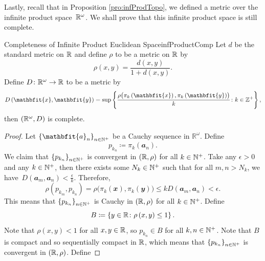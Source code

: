 \documentclass[math]{amznotes}
\theoremstyle{remark}
\begin{document}
Lastly, recall that in Proposition \ref{pro:infProdTopo}, we defined a metric over the infinite product space~$\mathbb{R}^{\omega}$. We shall prove that this infinite product space is still complete.
\begin{probox}{Completeness of Infinite Product Euclidean Space}{infProductComp}
    Let $d$ be the standard metric on $\mathbb{R}$ and define $\rho$ to be a metric on $\mathbb{R}$ by 
    \begin{equation*}
        \rho\left(x, y\right) = \frac{d\left(x, y\right)}{1 + d\left(x, y\right)}.
    \end{equation*}
    Define $D \colon \mathbb{R}^{\omega} \to \mathbb{R}$ to be a metric by 
    \begin{equation*}
        D\left(\mathbfit{x}, \mathbfit{y}\right) = \sup\left\{\frac{\rho\bigl(\pi_k\left(\mathbfit{x}\right), \pi_k\left(\mathbfit{y}\right)\bigr)}{k} \colon k \in \Z^+\right\},
    \end{equation*}
    then $\left(\mathbb{R}^{\omega}, D\right)$ is complete.
    \tcblower
    \begin{proof}
        Let $\left\{\mathbfit{a}_n\right\}_{n \in \N^+}$ be a Cauchy sequence in $\mathbb{R}^{\omega}$. Define 
        \begin{equation*}
            p_{k_n} \coloneqq \pi_k\left(\mathbfit{a}_n\right).
        \end{equation*}
        We claim that $\left\{p_{k_n}\right\}_{n \in \mathbb{N}^+}$ is convergent in $\left(\mathbb{R}, \rho\right)$ for all $k \in \mathbb{N}^+$. Take any $\epsilon > 0$ and any $k \in \mathbb{N}^+$, then there exists some $N_k \in \mathbb{N}^+$ such that for all $m, n > N_k$, we have~$D\left(\mathbfit{a}_m, \mathbfit{a}_n\right) < \frac{\epsilon}{k}$. Therefore,
        \begin{equation*}
            \rho\left(p_{k_m}, p_{k_n}\right) = \rho\bigl(\pi_k\left(\mathbfit{x}\right), \pi_k\left(\mathbfit{y}\right)\bigr) \leq kD\left(\mathbfit{a}_m, \mathbfit{a}_n\right) < \epsilon.
        \end{equation*}
        This means that $\left\{p_{k_n}\right\}_{n \in \mathbb{N}^+}$ is Cauchy in $\left(\mathbb{R}, \rho\right)$ for all $k \in \mathbb{N}^+$. Define 
        \begin{equation*}
            B \coloneqq \left\{y \in \mathbb{R} \colon \rho\left(x, y\right) \leq 1\right\}.
        \end{equation*}
        Note that $\rho\left(x, y\right) < 1$ for all $x, y \in \mathbb{R}$, so $p_{k_n} \in B$ for all $k, n \in \mathbb{N}^+$. Note that $B$ is compact and so sequentially compact in $\mathbb{R}$, which means that $\left\{p_{k_n}\right\}_{n \in \mathbb{N}^+}$ is convergent in $\left(\mathbb{R}, \rho\right)$. Define 

\end{proof}
\end{probox}
\end{document}

